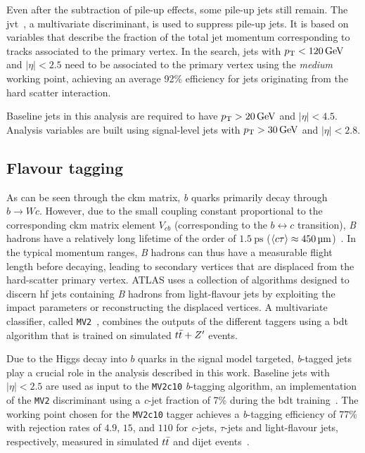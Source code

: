 Even after the subtraction of pile-up effects, some pile-up jets still remain. The \gls{jvt}~\cite{PERF-2014-03}, a multivariate discriminant, is used to suppress pile-up jets.
It is based on variables that describe the fraction of the total jet momentum corresponding to tracks associated to the primary vertex.
In the \onelepton search, jets with $\pt < \SI{120}{\GeV}$ and $\vert\eta\vert < 2.5$ need to be associated to the primary vertex using the \textit{medium}~\cite{Aad:2020flx} working point, achieving an average 92\% efficiency for jets originating from the hard scatter interaction.

Baseline jets in this analysis are required to have $\pt > \SI{20}{\GeV}$ and $\vert\eta\vert < 4.5$. Analysis variables are built using signal-level jets with $\pt > \SI{30}{\GeV}$ and $\vert\eta\vert < 2.8$.

\subsection{Flavour tagging}\label{sec:flavour_tagging}

As can be seen through the \gls{ckm} matrix, \textit{b} quarks primarily decay through $b\rightarrow W c$.
However, due to the small coupling constant proportional to the corresponding \gls{ckm} matrix element $V_{cb}$ (corresponding to the $b \leftrightarrow c $ transition), \textit{B} hadrons have a relatively long lifetime of the order of $\SI{1.5}{\pico\second}$ ($\braket{c\tau} \approx \SI{450}{\micro\meter}$)~\cite{pdg2020}.
In the typical momentum ranges, \textit{B} hadrons can thus have a measurable flight length before decaying, leading to secondary vertices that are displaced from the hard-scatter primary vertex.
ATLAS uses a collection of algorithms designed to discern \gls{hf} jets containing \textit{B} hadrons from light-flavour jets by exploiting the impact parameters or reconstructing the displaced vertices.
A multivariate classifier, called \texttt{MV2}~\cite{ATL-PHYS-PUB-2017-013}, combines the outputs of the different taggers using a \gls{bdt} algorithm that is trained on simulated $t\bar{t} + Z'$ events. 

Due to the Higgs decay into $b$ quarks in the signal model targeted, \textit{b}-tagged jets play a crucial role in the analysis described in this work.
Baseline jets with $\vert\eta\vert < 2.5$ are used as input to the \texttt{MV2c10} \textit{b}-tagging algorithm, an implementation of the \texttt{MV2} discriminant using a \textit{c}-jet fraction of 7\% during the \gls{bdt} training~\cite{FTAG-2018-01, PERF-2016-05}.
The working point chosen for the \texttt{MV2c10} tagger achieves a \textit{b}-tagging efficiency of 77\% with rejection rates of $4.9$, $15$, and $110$ for \textit{c}-jets, $\tau$-jets and light-flavour jets, respectively, measured in simulated $t\bar{t}$ and dijet events~\cite{FTAG-2018-01}.


